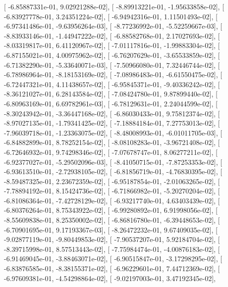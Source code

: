 \documentclass{article}
\begin{document}
       [ -6.85887331e-01,   9.02921288e-02],
       [ -8.89913221e-01,  -1.95633858e-02],
       [ -6.83927778e-01,   3.24351224e-02],
       [ -6.94942316e-01,   1.11501493e-02],
       [ -6.97341486e-01,  -9.63956264e-03],
       [ -8.77236992e-01,  -5.52259667e-03],
       [ -8.83933146e-01,  -1.44947222e-02],
       [ -6.88582768e-01,   2.17027693e-02],
       [ -8.03319817e-01,   6.41120967e-02],
       [ -7.01117816e-01,  -1.99883304e-02],
       [ -6.87155021e-01,   4.00975962e-02],
       [ -6.76207629e-01,  -3.65533859e-02],
       [ -6.71382290e-01,  -5.33640071e-03],
       [ -7.50966080e-01,   7.32446744e-02],
       [ -6.78986964e-01,  -8.18153169e-02],
       [ -7.08986483e-01,  -6.61550475e-02],
       [ -6.72447321e-01,   4.11438657e-02],
       [ -6.95845371e-01,  -9.40336242e-02],
       [ -8.36121027e-01,   6.28143584e-02],
       [ -7.08424780e-01,   9.87899440e-02],
       [ -6.80963169e-01,   6.69782961e-03],
       [ -6.78129631e-01,   2.24044599e-02],
       [ -8.30243942e-01,  -3.36447168e-02],
       [ -6.86030433e-01,   9.75812374e-02],
       [ -8.97027135e-01,  -1.79341425e-02],
       [ -7.18884184e-01,   7.27753013e-02],
       [ -7.96039718e-01,  -1.23363075e-02],
       [ -8.48008993e-01,  -6.01011705e-03],
       [ -6.84882899e-01,   8.78252154e-02],
       [ -8.08108283e-01,  -3.96721408e-02],
       [ -6.72646932e-01,   9.74298346e-02],
       [ -7.07678747e-01,   8.06277211e-02],
       [ -6.92377027e-01,  -5.29502096e-03],
       [ -8.41050715e-01,  -7.87253353e-02],
       [ -6.93613510e-01,  -2.72938105e-02],
       [ -6.81856719e-01,  -4.76830395e-02],
       [ -8.59487325e-01,   2.23672359e-02],
       [ -6.95187854e-01,  -2.01063265e-02],
       [ -7.78894192e-01,   8.15424736e-02],
       [ -6.71866982e-01,  -5.20270204e-02],
       [ -6.81086364e-01,  -7.42728129e-02],
       [ -6.93217740e-01,   4.63403439e-02],
       [ -6.80376264e-01,   8.75343922e-02],
       [ -6.99280892e-01,   6.91998056e-02],
       [ -8.55609838e-01,   8.25350002e-02],
       [ -6.86816780e-01,  -6.39448653e-02],
       [ -6.70901695e-01,   9.17193367e-03],
       [ -8.26472232e-01,   9.67409035e-02],
       [ -9.02877119e-01,  -9.80449853e-02],
       [ -7.90537207e-01,   5.92184704e-02],
       [ -8.39715998e-01,   8.57513443e-02],
       [ -7.75984474e-01,  -4.00876183e-02],
       [ -6.91469045e-01,  -3.88463071e-02],
       [ -6.90515847e-01,  -3.17298295e-02],
       [ -6.83876585e-01,  -8.38155371e-02],
       [ -6.96229601e-01,   7.44712369e-02],
       [ -6.97609381e-01,  -4.54298864e-02],
       [ -9.02197003e-01,   3.47192345e-02],
\end{document}
